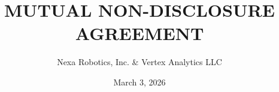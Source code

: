 \documentclass[11pt,letterpaper]{article}
\title{\sffamily\bfseries MUTUAL NON-DISCLOSURE AGREEMENT}
\author{Nexa Robotics, Inc. \& Vertex Analytics LLC}
\date{March 3, 2026}
\begin{document}








\clearpage
\nocite{*}


\end{document}

